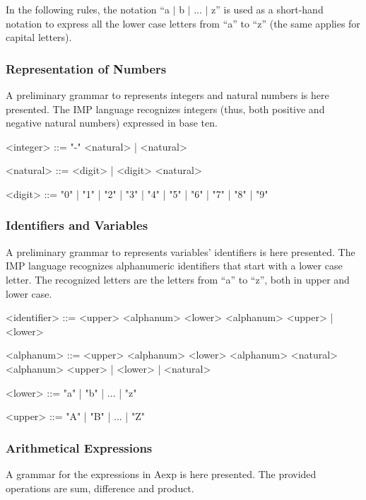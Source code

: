 \documentclass{esposito-documentation}
\begin{document}
In the following rules, the notation ``a $\mid$ b $\mid$ ... $\mid$ z'' is used
as a short-hand notation to express all the lower case letters from ``a'' to
``z'' (the same applies for capital letters).

\subsubsection{Representation of Numbers}\label{sec:grammar-numbers}

A preliminary grammar to represents integers and natural numbers is here
presented. The IMP language recognizes integers (thus, both positive and
negative natural numbers) expressed in base ten.

\begin{grammar}
	<integer> ::= "-" <natural> | <natural>

	<natural> ::= <digit> | <digit> <natural>

	<digit> ::= "0" | "1" | "2" | "3" | "4" | "5" | "6" | "7" | "8" | "9"
\end{grammar}

\subsubsection{Identifiers and Variables}\label{sec:grammar-id}

A preliminary grammar to represents variables' identifiers is here presented.
The IMP language recognizes alphanumeric identifiers that start with a lower
case letter. The recognized letters are the letters from ``a'' to ``z'', both
in upper and lower case.

\begin{grammar}
	<identifier> ::= <upper> <alphanum>
	\alt <lower> <alphanum>
	\alt <upper> | <lower> 
	
	<alphanum> ::= <upper> <alphanum>
	\alt <lower> <alphanum>
	\alt <natural> <alphanum>
	\alt<upper> | <lower> | <natural>

	<lower> ::= "a" | "b" | ... | "z"

	<upper> ::= "A" | "B" | ... | "Z"
\end{grammar}

\subsubsection{Arithmetical Expressions}\label{sec:grammar-aexp}

A grammar for the expressions in $\mathrm{Aexp}$ is here presented. The
provided operations are sum, difference and product.
\end{document}
